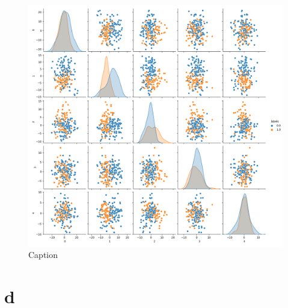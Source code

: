 \documentclass{article}
\begin{document}
\begin{figure}[H]
    \centering
    \includegraphics[scale = 0.3]{1c/True labels sns.png}
    \caption{Caption}
    \label{pca}
\end{figure}
\newpage
\section{d}
\end{document}
